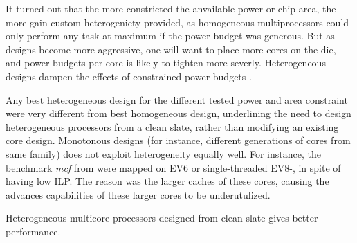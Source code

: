 
It turned out that the more constricted the anvailable power or chip area, the more gain custom heterogeniety provided, as homogeneous multiprocessors could only perform any task at maximum if the power budget was generous.
But as designs become more aggressive, one will want to place more cores on the die, and power budgets per core is likely to tighten more severly.
Heterogeneous designs dampen the effects of constrained power budgets \cite{heterogeneous-arch}.

Any best heterogeneous design for the different tested power and area constraint were very different from best homogeneous design, underlining the need to design heterogeneous processors from a clean slate, rather than modifying an existing core design.
Monotonous designs (for instance, different generations of cores from same family) does not exploit heterogeneity equally well.
For instance, the benchmark \textit{mcf} from \cite{heterogeneous-ee} were mapped on EV6 or single-threaded EV8-, in spite of having low ILP.
The reason was the larger caches of these cores, causing the advances capabilities of these larger cores to be underutulized.

Heterogeneous multicore processors designed from clean slate gives better performance.


